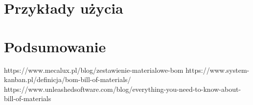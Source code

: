 \documentclass[12pt,twoside]{article}
\begin{document}
\clearpage
\section{Przykłady użycia}

\clearpage
\section{Podsumowanie}

\clearpage

\begin{thebibliography}{8}
\label{sec:bibliography}
https://www.mecalux.pl/blog/zestawienie-materialowe-bom
https://www.system-kanban.pl/definicja/bom-bill-of-materials/
https://www.unleashedsoftware.com/blog/everything-you-need-to-know-about-bill-of-materials
\end{thebibliography}
\clearpage
\end{document}
